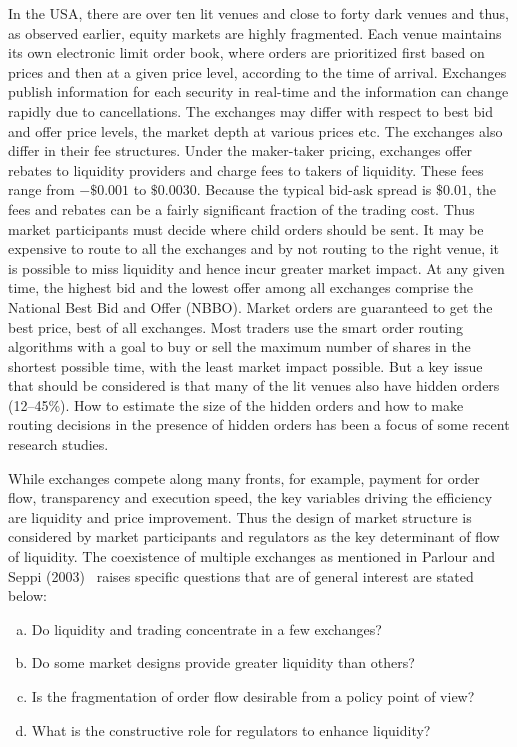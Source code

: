 In the USA, there are over ten lit venues and close to forty dark venues and thus, as observed earlier, equity markets are highly fragmented. Each venue maintains its own electronic limit order book, where orders are prioritized first based on prices and then at a given price level, according to the time of arrival. Exchanges publish information for each security in real-time and the information can change rapidly due to cancellations. The exchanges may differ with respect to best bid and offer price levels, the market depth at various prices etc. The exchanges also differ in their fee structures. Under the maker-taker pricing, exchanges offer rebates to liquidity providers and charge fees to takers of liquidity. These fees range from $-\$0.001$ to $\$0.0030$. Because the typical bid-ask spread is $\$0.01$, the fees and rebates can be a fairly significant fraction of the trading cost. Thus market participants must decide where child orders should be sent. It may be expensive to route to all the exchanges and by not routing to the right venue, it is possible to miss liquidity and hence incur greater market impact. At any given time, the highest bid and the lowest offer among all exchanges comprise the National Best Bid and Offer (NBBO). Market orders are guaranteed to get the best price, best of all exchanges. Most traders use the smart order routing algorithms with a goal to buy or sell the maximum number of shares in the shortest possible time, with the least market impact possible. But a key issue that should be considered is that many of the lit venues also have hidden orders (12--45\%). How to estimate the size of the hidden orders and how to make routing decisions in the presence of hidden orders has been a focus of some recent research studies.


While exchanges compete along many fronts, for example, payment for order flow, transparency and execution speed, the key variables driving the efficiency are liquidity and price improvement. Thus the design of market structure is considered by market participants and regulators as the key determinant of flow of liquidity. The coexistence of multiple exchanges as mentioned in Parlour and Seppi (2003)~\cite{parlour2003} raises specific questions that are of general interest are stated below:
        \begin{enumerate}[a)]
        \item Do liquidity and trading concentrate in a few exchanges?
        \item Do some market designs provide greater liquidity than others?
        \item Is the fragmentation of order flow desirable from a policy point of view?
        \item What is the constructive role for regulators to enhance liquidity?
        \end{enumerate}


